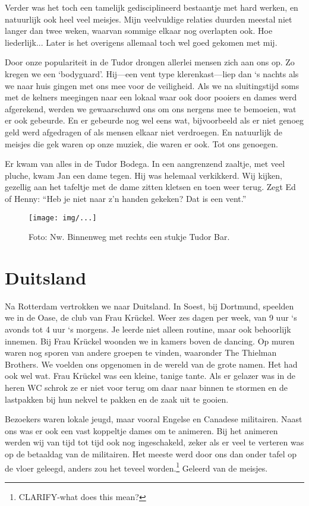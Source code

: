 \documentclass[10pt,twoside,openright]{memoir}
\begin{document}
Verder was het toch een tamelijk gedisciplineerd bestaantje met hard werken, en natuurlijk ook heel veel meisjes. Mijn veelvuldige relaties duurden meestal niet langer dan twee weken, waarvan sommige elkaar nog overlapten ook. Hoe liederlijk... Later is het overigens allemaal toch wel goed gekomen met mij. 

Door onze populariteit in de Tudor drongen allerlei mensen zich aan ons op. Zo kregen we een `bodyguard'. Hij---een vent type klerenkast---liep dan `s nachts als we naar huis gingen met ons mee voor de veiligheid. Als we na sluitingstijd soms met de kelners meegingen naar een lokaal waar ook door pooiers en dames werd afgerekend, werden we gewaarschuwd ons om ons nergens mee te bemoeien, wat er ook gebeurde. En er gebeurde nog wel eens wat, bijvoorbeeld als er niet genoeg geld werd afgedragen of als mensen elkaar niet verdroegen. En natuurlijk de meisjes die gek waren op onze muziek, die waren er ook. Tot ons genoegen. 

Er kwam van alles in de Tudor Bodega. In een aangrenzend zaaltje, met veel pluche, kwam Jan een dame tegen. Hij was helemaal verkikkerd. Wij kijken, gezellig aan het tafeltje met de dame zitten kletsen en toen weer terug. Zegt Ed of Henny: ``Heb je niet naar z’n handen gekeken? Dat is een vent.'' 

\begin{figure}[t]
\texttt{[image: img/...]}
\caption{Foto: Nw. Binnenweg met rechts een stukje Tudor Bar.}
\end{figure}

\chapter{Duitsland} %
\label{cha:duitsland}

Na Rotterdam vertrokken we naar Duitsland. In Soest, bij Dortmund, speelden we in de Oase, de club van Frau Krückel. Weer zes dagen per week, van 9 uur `s avonds tot 4 uur `s morgens. Je leerde niet alleen routine, maar ook behoorlijk innemen. Bij Frau Krückel woonden we in kamers boven de dancing. Op muren waren nog sporen van andere groepen te vinden, waaronder The Thielman Brothers. We voelden ons opgenomen in de wereld van de grote namen. Het had ook wel wat. Frau Krückel was een kleine, tanige tante. Als er gelazer was in de heren WC schrok ze er niet voor terug om daar naar binnen te stormen en de lastpakken bij hun nekvel te pakken en de zaak uit te gooien.

Bezoekers waren lokale jeugd, maar vooral Engelse en Canadese militairen. Naast ons was er ook een vast koppeltje dames om te animeren. Bij het animeren werden wij van tijd tot tijd ook nog ingeschakeld, zeker als er veel te verteren was op de betaaldag van de militairen. Het meeste werd door ons dan onder tafel op de vloer geleegd, anders zou het teveel worden.\footnote{CLARIFY-what does this mean?} Geleerd van de meisjes. 
\end{document}
